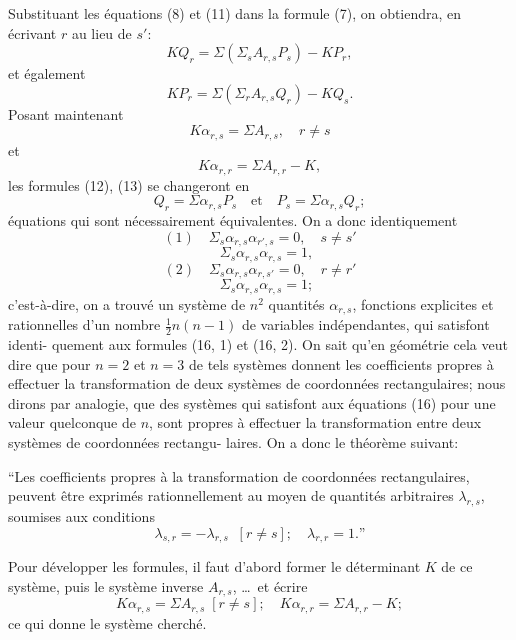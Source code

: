 \documentclass[11pt]{article}
\begin{document}
Substituant les \'equations (8) et (11) dans la formule (7), on obtiendra, en \'ecrivant $r$
au lieu de $s'$:
\[
K Q_{r} = \Sigma(\Sigma_{s} A_{r,s} P_{s}) - K P_{r} \tag{12},
\]
et \'egalement
\[
K P_{r} = \Sigma(\Sigma_{r} A_{r,s} Q_{r}) - K Q_{s} \tag{13}.
\]
Posant maintenant
\[
K \alpha_{r,s} = \Sigma A_{r,s}, \quad r \neq s
\]
et
\[
K \alpha_{r,r} = \Sigma A_{r,r} - K \tag{14},
\]
les formules (12), (13) se changeront en
\[
Q_{r} = \Sigma \alpha_{r,s} P_{s}\quad\text{et}\quad P_{s} = \Sigma \alpha_{r,s} Q_{r} \tag{15};
\]
\'equations qui sont n\'ecessairement \'equivalentes. On a donc identiquement
\[
(1)\quad \Sigma_{s}\alpha_{r,s}\alpha_{r',s} = 0, \quad s \neq s'
\]
\[
\quad\Sigma_{s}\alpha_{r,s}\alpha_{r,s} = 1,
\]
\[
(2)\quad \Sigma_{s}\alpha_{r,s}\alpha_{r,s'} = 0, \quad r \neq r'
\]
\[
\quad\Sigma_{s}\alpha_{r,s}\alpha_{r,s} = 1 \tag{16};
\]
c'est-\`a-dire, on a trouv\'e un syst\`eme de $n^{2}$ quantit\'es $\alpha_{r,s}$, fonctions explicites et
rationnelles d'un nombre $\tfrac{1}{2} n (n-1)$ de variables ind\'ependantes, qui satisfont identi-
quement aux formules (16, 1) et (16, 2). On sait qu'en g\'eom\'etrie cela veut dire que
pour $n = 2$ et $n = 3$ de tels syst\`emes donnent les coefficients propres \`a effectuer la
transformation de deux syst\`emes de coordonn\'ees rectangulaires; nous dirons par analogie,
que des syst\`emes qui satisfont aux \'equations (16) pour une valeur quelconque de $n$,
sont propres \`a effectuer la transformation entre deux syst\`emes de coordonn\'ees rectangu-
laires. On a donc le th\'eor\`eme suivant:

\smallskip
``Les coefficients propres \`a la transformation de coordonn\'ees rectangulaires, peuvent
\^etre exprim\'es rationnellement au moyen de quantit\'es arbitraires $\lambda_{r,s}$, soumises aux
conditions
\[
\lambda_{s,r} = -\lambda_{r,s}\;\; [r \neq s];\quad \lambda_{r,r} = 1.\text{''}
\]

Pour d\'evelopper les formules, il faut d'abord former le d\'eterminant $K$ de ce syst\`eme,
puis le syst\`eme inverse $A_{r,s}$, \ldots\ et \'ecrire
\[
K \alpha_{r,s} = \Sigma A_{r,s} \; [r \neq s];\quad K \alpha_{r,r} = \Sigma A_{r,r} - K;
\]
ce qui donne le syst\`eme cherch\'e.
\end{document}
